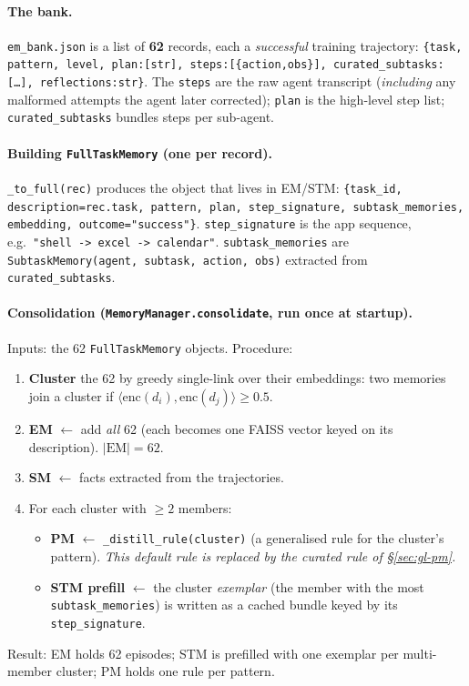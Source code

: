 \paragraph{The bank.} \texttt{em\_bank.json} is a list of \textbf{62} records, each a
\emph{successful} training trajectory:
\texttt{\{task, pattern, level, plan:[str], steps:[\{action,obs\}], curated\_subtasks:[\dots],
reflections:str\}}. The \texttt{steps} are the raw agent transcript (\emph{including} any malformed
attempts the agent later corrected); \texttt{plan} is the high-level step list;
\texttt{curated\_subtasks} bundles steps per sub-agent.

\paragraph{Building \texttt{FullTaskMemory} (one per record).} \texttt{\_to\_full(rec)} produces
the object that lives in EM/STM:
\texttt{\{task\_id, description=rec.task, pattern, plan, step\_signature, subtask\_memories, embedding,
outcome="success"\}}. \texttt{step\_signature} is the app sequence, e.g.\ \texttt{"shell -> excel ->
calendar"}. \texttt{subtask\_memories} are \texttt{SubtaskMemory(agent, subtask, action, obs)} extracted
from \texttt{curated\_subtasks}.

\paragraph{Consolidation (\texttt{MemoryManager.consolidate}, run once at startup).}
Inputs: the 62 \texttt{FullTaskMemory} objects. Procedure:
\begin{enumerate}\itemsep1pt
\item \textbf{Cluster} the 62 by greedy single-link over their embeddings: two memories join a
cluster if $\langle \mathrm{enc}(d_i),\mathrm{enc}(d_j)\rangle \ge 0.5$.
\item \textbf{EM} $\leftarrow$ add \emph{all} 62 (each becomes one FAISS vector keyed on its
description). $|\text{EM}|=62$.
\item \textbf{SM} $\leftarrow$ facts extracted from the trajectories.
\item For each cluster with $\ge 2$ members:
  \begin{itemize}\itemsep0pt
  \item \textbf{PM} $\leftarrow$ \texttt{\_distill\_rule(cluster)} (a generalised rule for the
  cluster's pattern). \emph{This default rule is replaced by the curated rule of
  \S\ref{sec:gl-pm}.}
  \item \textbf{STM prefill} $\leftarrow$ the cluster \emph{exemplar} (the member with the most
  \texttt{subtask\_memories}) is written as a cached bundle keyed by its \texttt{step\_signature}.
  \end{itemize}
\end{enumerate}
Result: EM holds 62 episodes; STM is prefilled with one exemplar per multi-member cluster; PM holds
one rule per pattern.

